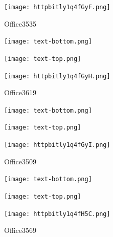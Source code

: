 \documentclass[letterpaper]{article}
\begin{document}
 \begingroup 
 \centerline{\texttt{[image: httpbitly1q4fGyF.png]}} 
 \endgroup 
 \vspace*{\fill} 

 \hfill{\small Office3535} 

  \vspace{0.7in} 
 
 \centerline{\texttt{[image: text-bottom.png]}} 
 
 \pagebreak 
{} 
 \vspace*{\fill} 
 
  \centerline{\texttt{[image: text-top.png]}} 
 
 \vspace{0.5in} 
 
 \begingroup 
 \centerline{\texttt{[image: httpbitly1q4fGyH.png]}} 
 \endgroup 
 \vspace*{\fill} 

 \hfill{\small Office3619} 

  \vspace{0.7in} 
 
 \centerline{\texttt{[image: text-bottom.png]}} 
 
 \pagebreak 
{} 
 \vspace*{\fill} 
 
  \centerline{\texttt{[image: text-top.png]}} 
 
 \vspace{0.5in} 
 
 \begingroup 
 \centerline{\texttt{[image: httpbitly1q4fGyI.png]}} 
 \endgroup 
 \vspace*{\fill} 

 \hfill{\small Office3509} 

  \vspace{0.7in} 
 
 \centerline{\texttt{[image: text-bottom.png]}} 
 
 \pagebreak 
{} 
 \vspace*{\fill} 
 
  \centerline{\texttt{[image: text-top.png]}} 
 
 \vspace{0.5in} 
 
 \begingroup 
 \centerline{\texttt{[image: httpbitly1q4fH5C.png]}} 
 \endgroup 
 \vspace*{\fill} 

 \hfill{\small Office3569} 

  \vspace{0.7in} 
 
\end{document}

